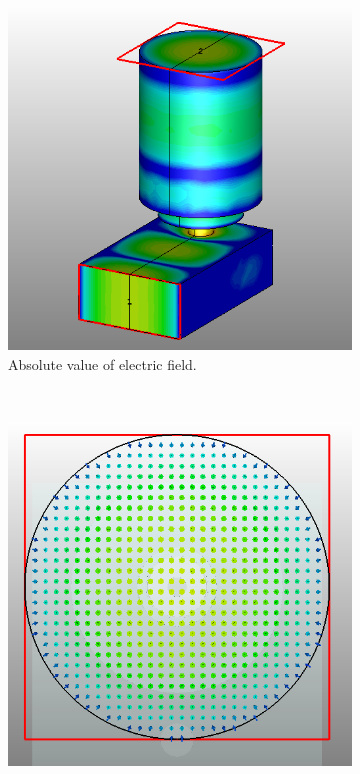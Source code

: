 \documentclass[english,twoside]{article}
\begin{document}
		\newpage
		\begin{landscape}
			\begin{figure}
				\centering
				\begin{subfigure}[b]{0.45\textwidth}
					\includegraphics[width=\textwidth]{figures/wrToWcTM01_abs}
					\caption{Absolute value of electric field.}
				\end{subfigure}
				~
				\begin{subfigure}[b]{0.45\textwidth}
					\includegraphics[width=\textwidth]{figures/wrToWcTM01_front}

\end{subfigure}
\end{figure}
\end{landscape}
\end{document}
